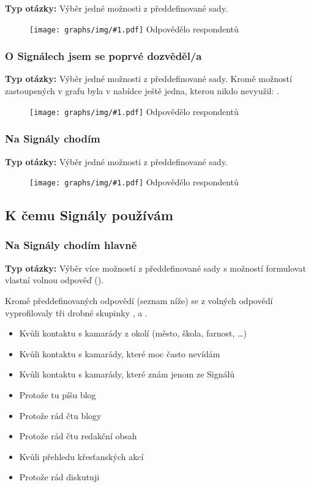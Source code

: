 \documentclass[12pt, a4paper, twoside]{article}
\newcommand{\answercount}[1]{Odpovědělo  respondentů}
\newcommand{\includegraph}[2]{
  \begin{figure}[H]
    \centering
    \textbf{#2}
    \texttt{[image: graphs/img/\#1.pdf]}
    \answercount{#1}
  \end{figure}
}
\newcommand{\qtype}{\textbf{Typ otázky:}
}
\newcommand{\pickOne}{Výběr jedné možnosti z předdefinované sady\xspace}
\newcommand{\pickMultiple}{Výběr více možností z předdefinované sady\xspace}
\newcommand{\withOther}{s možností formulovat vlastní volnou odpověď (\uv{Jiné})\xspace}
\begin{document}
\qtype \pickOne.

\includegraph{na_signalech_mam_profil}{}

\subsubsection{O Signálech jsem se poprvé dozvěděl/a}

\qtype \pickOne.
Kromě možností zastoupených v grafu byla v nabídce ještě jedna,
kterou nikdo nevyužil: .

\includegraph{o_signalech_jsem_se_poprve_dozvedel}{}

\subsubsection{Na Signály chodím}

\qtype \pickOne.

\includegraph{na_signaly_chodim}{}

\subsection{K čemu Signály používám}\label{sec:kcemu}

\subsubsection{Na Signály chodím hlavně}

\qtype \pickMultiple \withOther.

Kromě předdefinovaných odpovědí (seznam níže)
se z volných odpovědí vyprofilovaly tři drobné skupinky
,  a .

\begin{itemize}
\item Kvůli kontaktu s kamarády z okolí (město, škola, farnost, …)
\item Kvůli kontaktu s kamarády, které moc často nevídám
\item Kvůli kontaktu s kamarády, které znám jenom ze Signálů
\item Protože tu píšu blog
\item Protože rád čtu blogy
\item Protože rád čtu redakční obsah
\item Kvůli přehledu křesťanských akcí
\item Protože rád diskutuji
\end{itemize}
\end{document}
